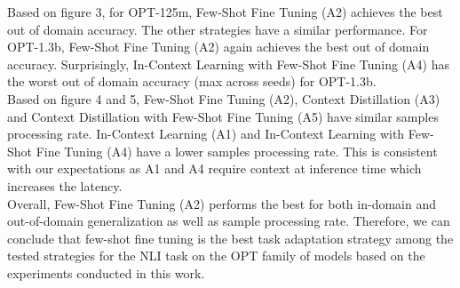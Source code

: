 \documentclass[10pt,twocolumn,letterpaper]{article}
\begin{document}
Based on figure 3, for OPT-125m, Few-Shot Fine Tuning (A2) achieves the best out of domain accuracy. The other strategies have a similar performance. For OPT-1.3b, Few-Shot Fine Tuning (A2) again achieves the best out of domain accuracy. Surprisingly, In-Context Learning with Few-Shot Fine Tuning (A4) has the worst out of domain accuracy (max across seeds) for OPT-1.3b.\\


Based on figure 4 and 5, Few-Shot Fine Tuning (A2), Context Distillation (A3) and Context Distillation with Few-Shot Fine Tuning (A5) have similar samples processing rate. In-Context Learning (A1) and In-Context Learning with Few-Shot Fine Tuning (A4) have a lower samples processing rate. This is consistent with our expectations as A1 and A4 require context at inference time which increases the latency.\\


Overall, Few-Shot Fine Tuning (A2) performs the best for both in-domain and out-of-domain generalization as well as sample processing rate. Therefore, we can conclude that few-shot fine tuning is the best task adaptation strategy among the tested strategies for the NLI task on the OPT family of models based on the experiments conducted in this work.
\end{document}
